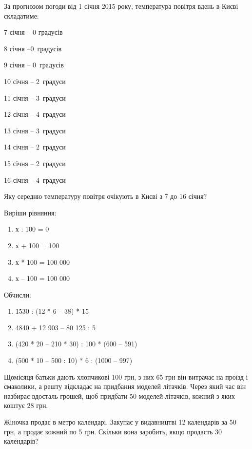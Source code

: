 \problem
За прогнозом погоди від 1 січня 2015 року, температура повітря вдень
в Києві складатиме:

\begin{multicols}{2}
    7 січня – 0 градусів

    8 січня –0 градусів

    9 січня – 0 градусів

    10 січня – 2 градуси

    11 січня – 3 градуси

    12 січня – 4 градуси

    13 січня – 3 градуси

    14 січня – 2 градуси

    15 січня – 2 градуси

    16 січня – 4 градуси
\end{multicols}

Яку середню температуру повітря очікують в Києві з 7 до 16 січня?


\problem
Виріши рівняння:
\begin{multicols}{2}
    \begin{enumerate}
        \item х : 100 = 0
        \item х + 100 = 100
        \item х * 100 = 100 000
        \item х – 100 = 100 000
    \end{enumerate}
\end{multicols}


\problem
Обчисли:
\begin{enumerate}
    \item 1530 : (12 * 6 – 38) * 15
    \item 4840 + 12 903 – 80 125 : 5
    \item (420 * 20 – 210 * 30) : 100 * (600 – 591)
    \item (500 * 10 – 500 : 10) * 6 : (1000 – 997)
\end{enumerate}


\problem
Щомісяця батьки дають хлопчикові 100 грн, з них 65 грн він витрачає
на проїзд і смаколики, а решту відкладає на придбання моделей літачків.
Через який час він назбирає вдосталь грошей, щоб придбати 50 моделей літачків,
кожний з яких коштує 28 грн.


\problem
Жіночка продає в метро календарі.
Закупає у видавництві 12 календарів за 50 грн, а продає кожний по 5 грн.
Скільки вона заробить, якщо продасть 30 календарів?



